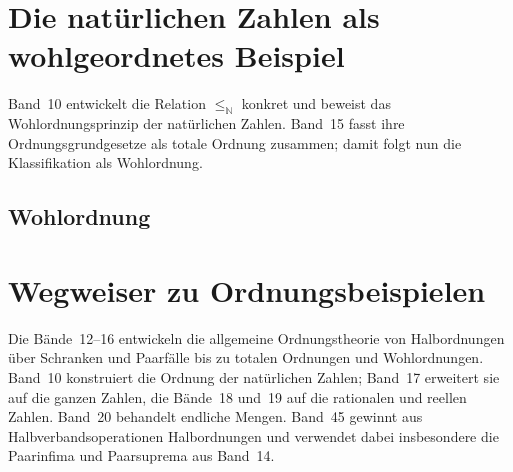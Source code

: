 \documentclass[main.tex]{subfiles}
\begin{document}
\begin{tabproofsplit}
  \proofpart{\(\vdash\)}
  \closeproofpart

  \proofpart{\(\dashv\)}
  \closeproofpart
\end{tabproofsplit}

\chapter{Die natürlichen Zahlen als wohlgeordnetes Beispiel}

Band~10 entwickelt die Relation \(\leq_{\mathbb N}\) konkret und beweist das
Wohlordnungsprinzip der natürlichen Zahlen. Band~15 fasst ihre
Ordnungsgrundgesetze als totale Ordnung zusammen; damit folgt nun die
Klassifikation als Wohlordnung.
\section{Wohlordnung}

\begin{tabproof}
\end{tabproof}

\chapter{Wegweiser zu Ordnungsbeispielen}

Die Bände~12--16 entwickeln die allgemeine Ordnungstheorie von Halbordnungen
über Schranken und Paarfälle bis zu totalen Ordnungen und Wohlordnungen.
Band~10 konstruiert die Ordnung der natürlichen Zahlen; Band~17 erweitert sie
auf die ganzen Zahlen, die Bände~18 und~19 auf die rationalen und reellen
Zahlen. Band~20 behandelt endliche Mengen. Band~45 gewinnt aus
Halbverbandsoperationen Halbordnungen und verwendet dabei insbesondere die
Paarinfima und Paarsuprema aus Band~14.
\end{document}
